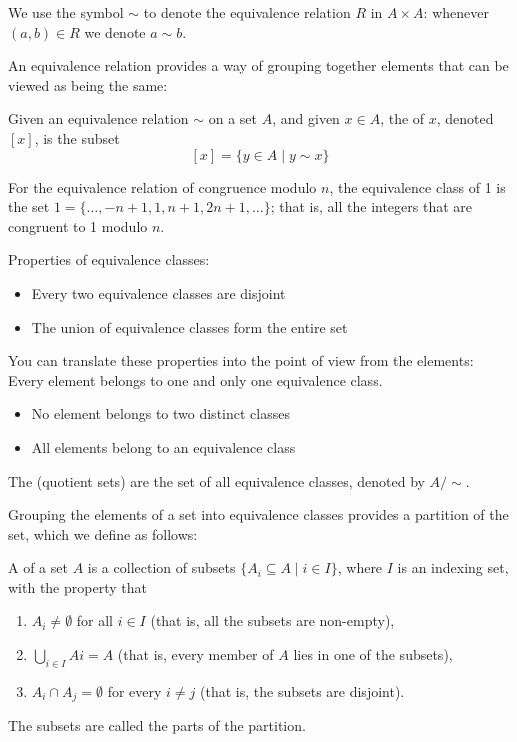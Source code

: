 \begin{notation}
We use the symbol $\sim$ to denote the equivalence relation $R$ in $A \times A$: whenever $(a,b)\in R$ we denote $a \sim b$.
\end{notation}

An equivalence relation provides a way of grouping together elements that can be viewed as being the same:

\begin{definition}
Given an equivalence relation $\sim$ on a set $A$, and given $x \in A$, the  of $x$, denoted $[x]$, is the subset
\[ [x] = \{y \in A \mid y \sim x\} \]
\end{definition}

\begin{example}
For the equivalence relation of congruence modulo $n$, the equivalence class of 1 is the set $1 = \{\dots, -n+1, 1, n+1, 2n+1, \dots\}$; that is, all the integers that are congruent to 1 modulo $n$.
\end{example}

Properties of equivalence classes:
\begin{itemize}
\item Every two equivalence classes are disjoint
\item The union of equivalence classes form the entire set
\end{itemize}

You can translate these properties into the point of view from the elements: Every element belongs to one and only one equivalence class.
\begin{itemize}
\item No element belongs to two distinct classes
\item All elements belong to an equivalence class
\end{itemize}

\begin{definition}
The  (quotient sets) are the set of all equivalence classes, denoted by $A/\sim$.
\end{definition}

Grouping the elements of a set into equivalence classes provides a partition of the set, which we define as follows:

\begin{definition}
A  of a set $A$ is a collection of subsets $\{A_i \subseteq A \mid i \in I\}$, where $I$ is an indexing set, with the property that
\begin{enumerate}[label=(\roman*)]
\item $A_i \neq \emptyset$ for all $i \in I$ (that is, all the subsets are non-empty),
\item $\bigcup_{i\in I} Ai = A$ (that is, every member of $A$ lies in one of the subsets),
\item $A_i \cap A_j = \emptyset$ for every $i \neq j$ (that is, the subsets are disjoint).
\end{enumerate}
The subsets are called the parts of the partition.
\end{definition}

